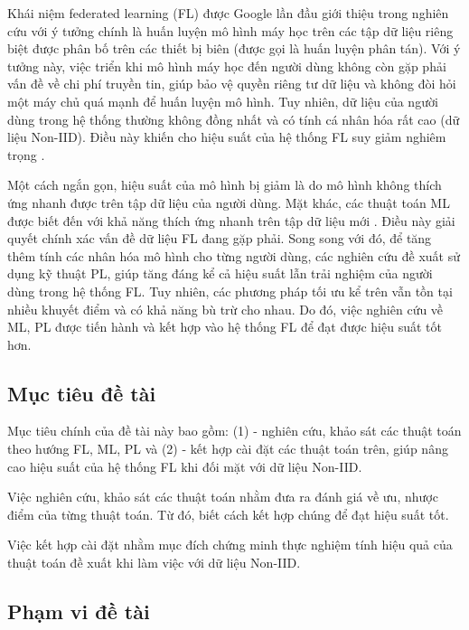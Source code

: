 Khái niệm federated learning (FL) được Google lần đầu giới thiệu trong nghiên cứu \cite{mcmahan2017communication} với ý tưởng chính là huấn luyện mô hình máy học trên các tập dữ liệu riêng biệt được phân bố trên các thiết bị biên (được gọi là huấn luyện phân tán). Với ý tưởng này, việc triển khi mô hình máy học đến người dùng không còn gặp phải vấn đề về chi phí truyền tin, giúp bảo vệ quyền riêng tư dữ liệu và không đòi hỏi một máy chủ quá mạnh để huấn luyện mô hình. Tuy nhiên, dữ liệu của người dùng trong hệ thống thường không đồng nhất và có tính cá nhân hóa rất cao (dữ liệu Non-IID). Điều này khiến cho hiệu suất của hệ thống FL suy giảm nghiêm trọng \cite{zhao2018federated}.

Một cách ngắn gọn, hiệu suất của mô hình bị giảm là do mô hình không thích ứng nhanh được trên tập dữ liệu của người dùng. Mặt khác, các thuật toán ML được biết đến với khả năng thích ứng nhanh trên tập dữ liệu mới \cite{hospedales2020meta}. Điều này giải quyết chính xác vấn đề dữ liệu FL đang gặp phải. Song song với đó, để tăng thêm tính các nhân hóa mô hình cho từng người dùng, các nghiên cứu \parencite{arivazhagan2019federated, liang2020think} đề xuất sử dụng kỹ thuật PL, giúp tăng đáng kể cả hiệu suất lẫn trải nghiệm của người dùng trong hệ thống FL. Tuy nhiên, các phương pháp tối ưu kể trên vẫn tồn tại nhiều khuyết điểm và có khả năng bù trừ cho nhau. Do đó, việc nghiên cứu về ML, PL được tiến hành và kết hợp vào hệ thống FL để đạt được hiệu suất tốt hơn.

\subsection*{Mục tiêu đề tài}

Mục tiêu chính của đề tài này bao gồm: (1) - nghiên cứu, khảo sát các thuật toán theo hướng FL, ML, PL và (2) - kết hợp cài đặt các thuật toán trên, giúp nâng cao hiệu suất của hệ thống FL khi đối mặt với dữ liệu Non-IID.

Việc nghiên cứu, khảo sát các thuật toán nhằm đưa ra đánh giá về ưu, nhược điểm của từng thuật toán. Từ đó, biết cách kết hợp chúng để đạt hiệu suất tốt.

Việc kết hợp cài đặt nhằm mục đích chứng minh thực nghiệm tính hiệu quả của thuật toán đề xuất khi làm việc với dữ liệu Non-IID.

\subsection*{Phạm vi đề tài}

